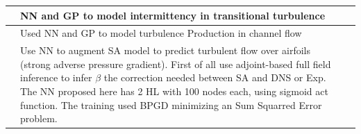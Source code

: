 \documentclass[a4paper,12pt]{report}
\newcommand\bk{\color{black}}
\newcommand\navy{\color{navy}}
\newcommand\red{\color{red}}
\numberwithin{equation}{section} %
\begin{document}
\begin{table}[!ht]
\begin{tabular}{|M{.2\textwidth}|M{.74\textwidth}|N }
		\textbf{\cite{duraisamy2015new}} & \red NN and GP \bk to \navy model intermittency in transitional turbulence \bk &\\[1.5cm] \hline 		
		
		\textbf{\cite{zhang2015machine}} & Used \red NN and GP \bk to \navy model turbulence Production in channel flow \bk &\\[1.5cm] \hline
		
		\textbf{\cite{singh2017machine}} &Use \red NN \bk to augment SA model to predict turbulent flow over airfoils (strong adverse pressure gradient). First of all use adjoint-based full field inference to infer $\beta$ the correction needed between SA and DNS or Exp. The \red NN \bk proposed here has 2 HL with 100 nodes each, using sigmoid act function. The training used BPGD minimizing an Sum Squarred Error problem.&\\[3cm] \hline 
				
		\end{tabular} 
		\vspace{0.5cm}
		
\end{table}

\pagebreak



\end{document}

